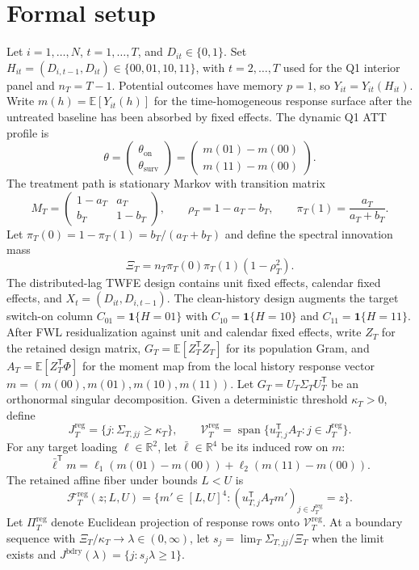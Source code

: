 \documentclass[11pt]{article}
\newcommand{\E}{\mathbb{E}}
\newcommand{\one}{\mathbf{1}}
\newcommand{\transpose}{\mathsf{T}}
\newcommand{\calF}{\mathcal{F}}
\newcommand{\R}{\mathbb{R}}
\theoremstyle{definition}
\theoremstyle{plain}
\theoremstyle{remark}
\begin{document}
\section{Formal setup}
Let \(i=1,\ldots,N\), \(t=1,\ldots,T\), and \(D_{it}\in\{0,1\}\).
Set \(H_{it}=(D_{i,t-1},D_{it})\in\{00,01,10,11\}\), with \(t=2,\ldots,T\) used for the Q1 interior panel and \(n_T=T-1\).
Potential outcomes have memory \(p=1\), so \(Y_{it}=Y_{it}(H_{it})\).
Write \(m(h)=\E[Y_{it}(h)]\) for the time-homogeneous response surface after the untreated baseline has been absorbed by fixed effects.
The dynamic Q1 ATT profile is
\[
\theta =
\begin{pmatrix}
\theta_{\mathrm{on}}\\
\theta_{\mathrm{surv}}
\end{pmatrix}
=
\begin{pmatrix}
m(01)-m(00)\\
m(11)-m(00)
\end{pmatrix}.
\]
The treatment path is stationary Markov with transition matrix
\[
M_T=
\begin{pmatrix}
1-a_T & a_T\\
b_T & 1-b_T
\end{pmatrix},
\qquad
\rho_T=1-a_T-b_T,\qquad
\pi_T(1)=\frac{a_T}{a_T+b_T}.
\]
Let \(\pi_T(0)=1-\pi_T(1)=b_T/(a_T+b_T)\) and define the spectral innovation mass
\[
\Xi_T=n_T\pi_T(0)\pi_T(1)(1-\rho_T^2).
\]
The distributed-lag TWFE design contains unit fixed effects, calendar fixed effects, and \(X_t=(D_{it},D_{i,t-1})\).
The clean-history design augments the target switch-on column \(C_{01}=\one\{H=01\}\) with \(C_{10}=\one\{H=10\}\) and \(C_{11}=\one\{H=11\}\).
After FWL residualization against unit and calendar fixed effects, write \(Z_T\) for the retained design matrix, \(G_T=\E[Z_T^\transpose Z_T]\) for its population Gram, and \(A_T=\E[Z_T^\transpose \Phi]\) for the moment map from the local history response vector \(m=(m(00),m(01),m(10),m(11))\).
Let \(G_T=U_T\Sigma_TU_T^\transpose\) be an orthonormal singular decomposition.
Given a deterministic threshold \(\kappa_T>0\), define
\[
J_T^{\mathrm{reg}}=\{j:\Sigma_{T,jj}\ge \kappa_T\},
\qquad
\mathcal V_T^{\mathrm{reg}}=\operatorname{span}\{u_{T,j}^\transpose A_T:j\in J_T^{\mathrm{reg}}\}.
\]
For any target loading \(\ell\in\R^2\), let \(\bar \ell\in\R^4\) be its induced row on \(m\):
\[
\bar\ell^\transpose m
=
\ell_1(m(01)-m(00))+\ell_2(m(11)-m(00)).
\]
The retained affine fiber under bounds \(L<U\) is
\[
\calF_T^{\mathrm{reg}}(z;L,U)=
\{m'\in[L,U]^4: (u_{T,j}^\transpose A_Tm')_{j\in J_T^{\mathrm{reg}}}=z\}.
\]
Let \(\Pi_T^{\mathrm{reg}}\) denote Euclidean projection of response rows onto \(\mathcal V_T^{\mathrm{reg}}\).
At a boundary sequence with \(\Xi_T/\kappa_T\to\lambda\in(0,\infty)\), let \(s_j=\lim_T \Sigma_{T,jj}/\Xi_T\) when the limit exists and \(J^{\mathrm{bdry}}(\lambda)=\{j:s_j\lambda\ge1\}\).
\end{document}
